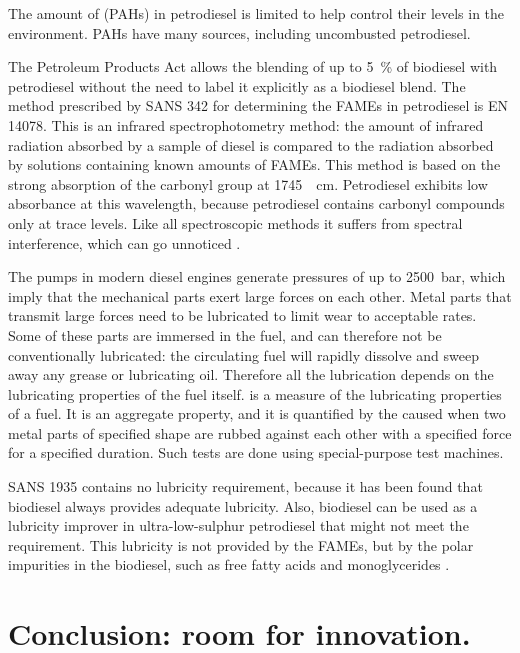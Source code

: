 The amount of  (PAHs) in petrodiesel
is limited to help control their levels in the environment. PAHs have many
sources, including uncombusted petrodiesel.

The Petroleum Products Act allows the blending of up to \SI{5}{\percent} of
biodiesel with petrodiesel without the need to label it explicitly as a biodiesel
blend. The method prescribed by SANS 342 for determining the FAMEs in
petrodiesel is EN 14078. This is an infrared spectrophotometry method: the
amount of infrared radiation absorbed by a sample of diesel is compared to the
radiation absorbed by solutions containing known amounts of FAMEs. This method
is based on the strong absorption of the carbonyl group at
\SI{1745}{\per\centi\metre}. Petrodiesel exhibits low absorbance at this
wavelength, because petrodiesel contains carbonyl compounds only at trace
levels. Like all spectroscopic methods it suffers from spectral interference,
which can go unnoticed \autocite{Pinho2014}.

The pumps in modern diesel engines generate pressures of up to
\SI{2500}{\bar}, which imply that the mechanical parts exert large forces on each other.
Metal parts that transmit large forces need to be lubricated to limit wear to
acceptable rates. Some of these parts are immersed in the fuel, and can
therefore not be conventionally lubricated: the circulating fuel will rapidly
dissolve and sweep away any grease or lubricating oil. Therefore all the
lubrication depends on the lubricating properties of the fuel itself.
 is a measure of the lubricating properties of a fuel. It is
an aggregate property, and it is quantified by the  caused
when two metal parts of specified shape are rubbed against each other with a
specified force for a specified duration. Such tests are done using
special-purpose test machines.

SANS 1935 contains no lubricity requirement, because it has been found that
biodiesel always provides adequate lubricity. Also, biodiesel can be used as a
lubricity improver in ultra-low-sulphur petrodiesel that might not meet the
requirement. This lubricity is not provided by the FAMEs, but by the polar
impurities in the biodiesel, such as free fatty acids and monoglycerides
\autocite{Knothe2005}.

\section{Conclusion: room for innovation.}

